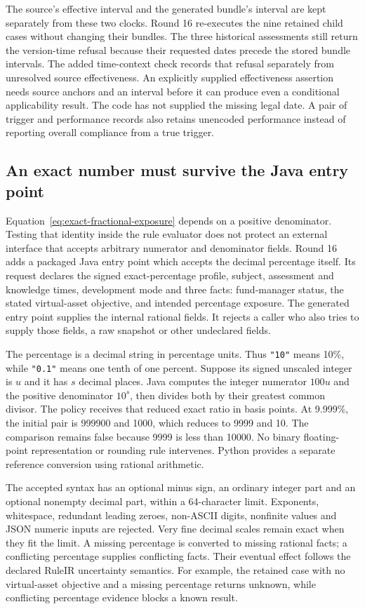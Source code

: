 The source's effective interval and the generated bundle's interval are kept
separately from these two clocks. Round 16 re-executes the nine retained child
cases without changing their bundles. The three historical assessments still
return the version-time refusal because their requested dates precede the
stored bundle intervals. The added time-context check records that refusal
separately from unresolved source effectiveness. An explicitly supplied
effectiveness assertion needs source anchors and an interval before it can
produce even a conditional applicability result. The code has not supplied the
missing legal date. A pair of trigger and performance records also retains
unencoded performance instead of reporting overall compliance from a true
trigger.

\subsection{An exact number must survive the Java entry point}

Equation~\ref{eq:exact-fractional-exposure} depends on a positive denominator.
Testing that identity inside the rule evaluator does not protect an external
interface that accepts arbitrary numerator and denominator fields. Round 16
adds a packaged Java entry point which accepts the decimal percentage itself.
Its request declares the signed exact-percentage profile, subject, assessment
and knowledge times, development mode and three facts: fund-manager status,
the stated virtual-asset objective, and intended percentage exposure. The
generated entry point supplies the internal rational fields. It rejects a
caller who also tries to supply those fields, a raw snapshot or other
undeclared fields.

The percentage is a decimal string in percentage units. Thus \texttt{"10"}
means 10\%, while \texttt{"0.1"} means one tenth of one percent. Suppose its
signed unscaled integer is $u$ and it has $s$ decimal places. Java computes the
integer numerator $100u$ and the positive denominator $10^s$, then divides
both by their greatest common divisor. The policy receives that reduced exact
ratio in basis points. At 9.999\%, the initial pair is 999900 and 1000, which
reduces to 9999 and 10. The comparison remains false because 9999 is less than
10000. No binary floating-point representation or rounding rule intervenes.
Python provides a separate reference conversion using rational arithmetic.

The accepted syntax has an optional minus sign, an ordinary integer part and
an optional nonempty decimal part, within a 64-character limit. Exponents,
whitespace, redundant leading zeroes, non-ASCII digits, nonfinite values and
JSON numeric inputs are rejected. Very fine decimal scales remain exact when
they fit the limit. A missing percentage is converted to missing rational
facts; a conflicting percentage supplies conflicting facts. Their eventual
effect follows the declared RuleIR uncertainty semantics. For example, the
retained case with no virtual-asset objective and a missing percentage returns
unknown, while conflicting percentage evidence blocks a known result.

